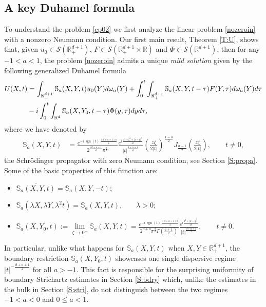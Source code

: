 \documentclass[11pt,letter]{amsart}
\def \RN {\mathbb{R}_+^{d+1}}
\def \R {\mathbb{R}}
\newcommand{\Rd}{\mathbb R^d}
\newcommand{\la}{\lambda}
\numberwithin{equation}{section}
\numberwithin{equation}{section}
\begin{document}
\subsection{A key Duhamel formula} To understand the problem \eqref{cp02} we first analyze the linear problem \eqref{nozeroin} with a nonzero Neumann condition.
Our first main result, Theorem \ref{T:U}, shows that, given $u_0\in \mathscr S(\RN)$, $F\in \mathscr S(\RN\times \R)$ and $\Phi\in \mathscr S(\R^{d+1})$, then for any $-1<a<1$, the problem \eqref{nozeroin} admits a unique \emph{mild solution} given by the following generalized Duhamel formula
\begin{align}\label{nicea1in}
U(X,t) & = \int_{\RN} \mathbb S_a(X,Y,t) u_0(Y)d\omega_a(Y) +  \int_0^t \int_{\RN} \mathbb S_a(X,Y,t-\tau) F(Y,\tau) d\omega_a(Y) d\tau
\\
& - i \int_0^{t} \int_{\Rd}  \mathbb S_a(X,Y_0,t-\tau) \Phi(y,\tau) dy d\tau,
\notag
\end{align}
where we have denoted by
\begin{align*}
\mathbb S_a(X,Y,t)
&= \frac{e^{-i\,\operatorname{sgn}(t)\,\frac{(d+a+1)\pi}{4}}}{2^{\frac{2d+a+1}{2}}\pi^{\frac d2}}  
\frac{e^{i\,\frac{z^2+\zeta^2+|x-y|^2}{4t}}}{|t|^{\frac{d+a+1}{2}}}\left(\frac{z\zeta}{2|t|}\right)^{\frac{1-a}{2}}
J_{\frac{a-1}{2}}\!\left(\frac{z\zeta}{2|t|}\right),
\qquad t\neq 0,
\end{align*}
the Schr\"odinger propagator with zero Neumann condition, see Section \ref{S:propa}. Some of the basic properties of this function are:
\begin{itemize}
\item[(1)] $\overline{\mathbb S_a(X,Y,t)} = \mathbb S_a(X,Y,-t)$;
\item[(2)] $\mathbb S_a(\la X,\la Y,\la^2 t) = \mathbb S_a(X,Y,t)$,\ \ \ \ $\la>0$;
\item[(3)]
$\mathbb S_a(X,Y_0,t) :=\underset{\zeta\to 0^+}{\lim} \mathbb S_a(X,Y,t)
=
\frac{ e^{-i\,\operatorname{sgn}(t)\,\frac{(d+a+1)\pi}{4}}}{2^{d+a}\pi^{\frac d2}\Gamma\!\left(\frac{a+1}{2}\right)}
\frac{e^{i \frac{z^2+|x-y|^2}{4t}}}{|t|^{\frac{d+a+1}{2}}},
\qquad t\neq 0$.
\end{itemize}
In particular, unlike what happens for $\mathbb S_a(X,Y,t)$ when $X, Y\in \RN$, the boundary restriction $\mathbb S_a(X,Y_0,t)$ showcases one single dispersive regime $|t|^{-\frac{d+a+1}{2}}$ for all $a>-1$.
This fact is responsible for the surprising uniformity of boundary Strichartz estimates in Section \ref{S:bdry} which, unlike the estimates in the bulk in Section \ref{S:stri}, do not distinguish between the two regimes $-1<a<0$ and $0\le a < 1$.  
\end{document}
